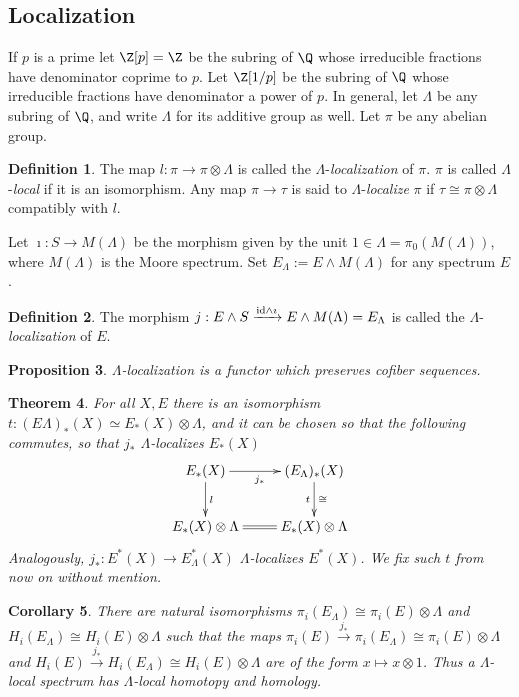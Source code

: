 \documentclass[11pt]{article}
\renewcommand{\comment}{}
\theoremstyle{plain}
\newtheorem{thm}{Theorem}[subsection]
\newtheorem{prop}[thm]{Proposition}
\newtheorem{cor}[thm]{Corollary}
\theoremstyle{definition}
\newtheorem{defn}[thm]{Definition}
\begin{document}
\subsection{Localization}
\comment{
If $p$ is a prime let $\Z[p]=\Z$ be the subring of $\Q$ whose irreducible
fractions have denominator coprime to $p$. Let $\Z[1/p]$ be the subring of $\Q$
whose irreducible fractions have denominator a power of $p$. In general, let
$\Lambda$ be any subring of $\Q$, and write $\Lambda$ for its additive group as
well. Let $\pi$ be any abelian group.
\begin{defn}
The map $l:\pi\to\pi\otimes \Lambda$ is called the $\Lambda$-\emph{localization}
of $\pi$. $\pi$ is called $\Lambda$-\emph{local} if it is an isomorphism. Any
map $\pi\to\tau$ is said to $\Lambda$-\emph{localize} $\pi$ if $\tau\cong
\pi\otimes\Lambda$ compatibly with $l$.
\end{defn}
Let $\imath:S\to M(\Lambda)$ be the morphism given by the unit
$1\in\Lambda=\pi_0(M(\Lambda))$, where $M(\Lambda)$ is the Moore spectrum. Set
$E_\Lambda:=E\wedge M(\Lambda)$ for any spectrum $E$.
\begin{defn}
The morphism $j:E\wedge S\xrightarrow{\textup{id}\wedge \imath}E\wedge
M(\Lambda)=E_\Lambda$ is called the $\Lambda$-\emph{localization} of $E$.
\end{defn}
\begin{prop}
$\Lambda$-localization is a functor which preserves cofiber sequences.
\end{prop}
\begin{thm}
For all $X,E$ there is an isomorphism $t:(E\Lambda)_*(X)\simeq E_*(X)\otimes
\Lambda$, and it can be chosen so that the following commutes, so that $j_*$
$\Lambda$-localizes $E_*(X)$\upcol
\[\xymatrix{
E_*(X)\ar[r]_{j_*}\ar[d]^l&(E_\Lambda)_*(X)\ar[d]_t^\cong\\
E_*(X)\otimes\Lambda&E_*(X)\otimes\Lambda\ar@{=}[l]
}\]
Analogously, $j_*:E^*(X)\to E_\Lambda^*(X)$ $\Lambda$-localizes $E^*(X)$.
We fix such $t$ from now on without mention.
\end{thm}
\begin{cor}
There are natural isomorphisms $\pi_i(E_\Lambda)\cong \pi_i(E)\otimes\Lambda$
and $H_i(E_\Lambda)\cong H_i(E)\otimes\Lambda$ such that the maps
$\pi_i(E)\xrightarrow{j_*}\pi_i(E_\Lambda)\cong\pi_i(E)\otimes\Lambda$ and
$H_i(E)\xrightarrow{j_*}H_i(E_\Lambda)\cong H_i(E)\otimes\Lambda$ are of the
form $x\mapsto x\otimes1$. Thus a $\Lambda$-local spectrum has $\Lambda$-local
homotopy and homology.
\end{cor}
}
\end{document}
